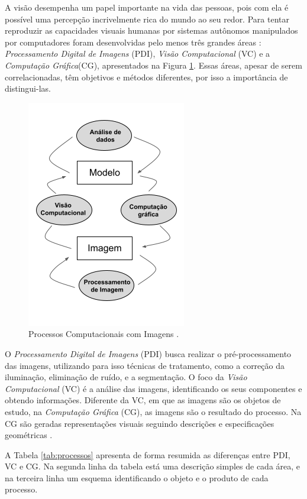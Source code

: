 \documentclass[
  brazilian,
]{book}
\begin{document}
A visão desempenha um papel importante na vida das pessoas, pois com ela é possível uma percepção incrivelmente rica do mundo ao seu redor. Para tentar reproduzir as capacidades visuais humanas por sistemas autônomos manipulados por computadores foram desenvolvidas pelo menos três grandes áreas \autocite[p.~2]{velho2009}: \emph{Processamento Digital de Imagens} (PDI), \emph{Visão Computacional} (VC) e a \emph{Computação Gráfica}(CG), apresentados na Figura \ref{fig:areasPDI}. Essas áreas, apesar de serem correlacionadas, têm objetivos e métodos diferentes, por isso a importância de distingui-las.



\begin{figure}

{\centering \includegraphics[width=0.4\linewidth]{imagens/01-introducao/areasPDI} 

}

\caption{Processos Computacionais com Imagens \autocite[p.~2]{velho2009}.}\label{fig:areasPDI}
\end{figure}

O \emph{Processamento Digital de Imagens} (PDI) busca realizar o pré-processamento das imagens, utilizando para isso técnicas de tratamento, como a correção da iluminação, eliminação de ruído, e a segmentação. O foco da \emph{Visão Computacional} (VC) é a análise das imagens, identificando os seus componentes e obtendo informações. Diferente da VC, em que as imagens são os objetos de estudo, na \emph{Computação Gráfica} (CG), as imagens são o resultado do processo. Na CG são geradas representações visuais seguindo descrições e especificações geométricas \autocite[p.~3]{velho2009}.

A Tabela \ref{tab:processos} apresenta de forma resumida as diferenças entre PDI, VC e CG. Na segunda linha da tabela está uma descrição simples de cada área, e na terceira linha um esquema identificando o objeto e o produto de cada processo.
\end{document}
